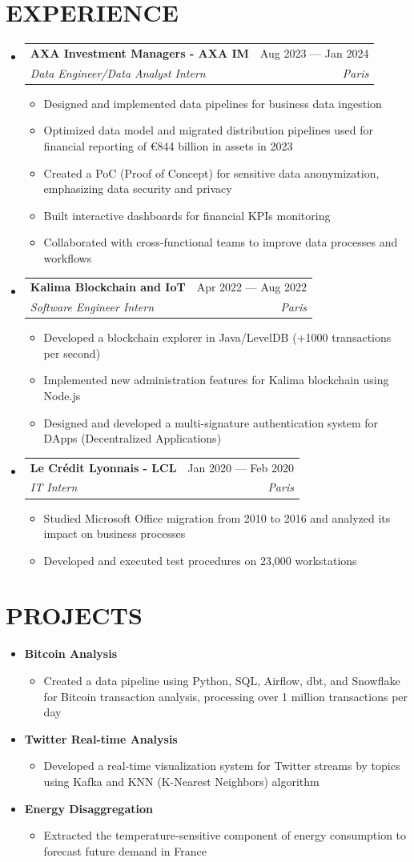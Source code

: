 \documentclass[11pt,a4paper]{article}
\makeatletter
\newcommand{\resumeItem}[1]{
  \item\footnotesize{
    {#1 \vspace{-1pt}}
  }
}
\newcommand{\resumeSubheading}[4]{
  \vspace{2pt}\item
    \begin{tabular*}{\textwidth}[t]{l@{\extracolsep{\fill}}r}
      {\footnotesize\textbf{#1}} & {\footnotesize#2} \\
      {\footnotesize\textit{#3}} & {\footnotesize\textit{#4}} \\
    \end{tabular*}\vspace{2pt}
}
\newcommand{\resumeProjectHeading}[2]{
  \item
  {\footnotesize#1} \hfill {#2}
}
\newcommand{\resumeSubHeadingListStart}{\begin{itemize}[leftmargin=0in, label={}]}
\newcommand{\resumeSubHeadingListEnd}{\end{itemize}}
\newcommand{\resumeItemListStart}{\begin{itemize}[label={\textbullet}]}
\newcommand{\resumeItemListEnd}{\end{itemize}\vspace{0pt}}
\makeatother
\begin{document}
\section{EXPERIENCE}
\resumeSubHeadingListStart
    \resumeSubheading
      {AXA Investment Managers - AXA IM}{Aug 2023 --- Jan 2024}
      {Data Engineer/Data Analyst Intern}{Paris}
      \resumeItemListStart
        \resumeItem{Designed and implemented data pipelines for business data ingestion}
        \resumeItem{Optimized data model and migrated distribution pipelines used for financial reporting of €844 billion in assets in 2023}
        \resumeItem{Created a PoC (Proof of Concept) for sensitive data anonymization, emphasizing data security and privacy}
        \resumeItem{Built interactive dashboards for financial KPIs monitoring}
        \resumeItem{Collaborated with cross-functional teams to improve data processes and workflows}
      \resumeItemListEnd
    \resumeSubheading
      {Kalima Blockchain and IoT}{Apr 2022 --- Aug 2022}
      {Software Engineer Intern}{Paris}
      \resumeItemListStart
        \resumeItem{Developed a blockchain explorer in Java/LevelDB (+1000 transactions per second)}
        \resumeItem{Implemented new administration features for Kalima blockchain using Node.js}
        \resumeItem{Designed and developed a multi-signature authentication system for DApps (Decentralized Applications)}
      \resumeItemListEnd
    \resumeSubheading
      {Le Crédit Lyonnais - LCL}{Jan 2020 --- Feb 2020}
      {IT Intern}{Paris}
      \resumeItemListStart
        \resumeItem{Studied Microsoft Office migration from 2010 to 2016 and analyzed its impact on business processes}
        \resumeItem{Developed and executed test procedures on 23,000 workstations}
      \resumeItemListEnd
  \resumeSubHeadingListEnd

\section{PROJECTS}
\resumeSubHeadingListStart
    \resumeProjectHeading
      {\textbf{Bitcoin Analysis}} {}
      \resumeItemListStart
        \resumeItem{Created a data pipeline using Python, SQL, Airflow, dbt, and Snowflake for Bitcoin transaction analysis, processing over 1 million transactions per day}
      \resumeItemListEnd
    \resumeProjectHeading
      {\textbf{Twitter Real-time Analysis}} {}
      \resumeItemListStart
        \resumeItem{Developed a real-time visualization system for Twitter streams by topics using Kafka and KNN (K-Nearest Neighbors) algorithm}
      \resumeItemListEnd
    \resumeProjectHeading
      {\textbf{Energy Disaggregation \@Capgemini}} {}
      \resumeItemListStart
        \resumeItem{Extracted the temperature-sensitive component of energy consumption to forecast future demand in France}
      \resumeItemListEnd
\resumeSubHeadingListEnd
\end{document}
